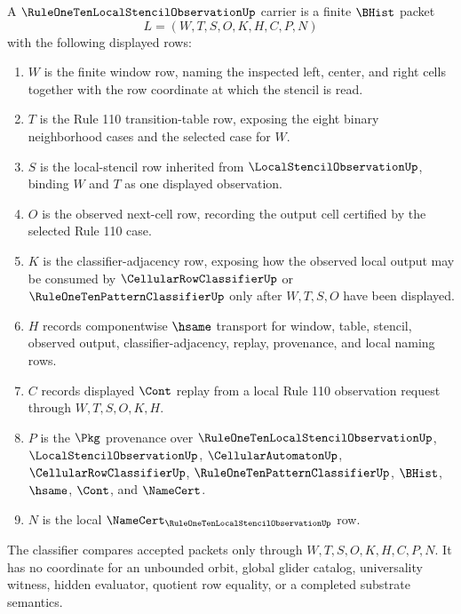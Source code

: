 \begin{definition}
\label{def:rule110-local-stencil-observation-carrier}
A $\RuleOneTenLocalStencilObservationUp$ carrier is a finite $\BHist$ packet
$$
L=(W,T,S,O,K,H,C,P,N)
$$
with the following displayed rows:
\begin{enumerate}
\item $W$ is the finite window row, naming the inspected left, center, and right cells together with the row coordinate at which the stencil is read.
\item $T$ is the Rule 110 transition-table row, exposing the eight binary neighborhood cases and the selected case for $W$.
\item $S$ is the local-stencil row inherited from $\LocalStencilObservationUp$, binding $W$ and $T$ as one displayed observation.
\item $O$ is the observed next-cell row, recording the output cell certified by the selected Rule 110 case.
\item $K$ is the classifier-adjacency row, exposing how the observed local output may be consumed by $\CellularRowClassifierUp$ or $\RuleOneTenPatternClassifierUp$ only after $W,T,S,O$ have been displayed.
\item $H$ records componentwise $\hsame$ transport for window, table, stencil, observed output, classifier-adjacency, replay, provenance, and local naming rows.
\item $C$ records displayed $\Cont$ replay from a local Rule 110 observation request through $W,T,S,O,K,H$.
\item $P$ is the $\Pkg$ provenance over $\RuleOneTenLocalStencilObservationUp$, $\LocalStencilObservationUp$, $\CellularAutomatonUp$, $\CellularRowClassifierUp$, $\RuleOneTenPatternClassifierUp$, $\BHist$, $\hsame$, $\Cont$, and $\NameCert$.
\item $N$ is the local $\NameCert_{\RuleOneTenLocalStencilObservationUp}$ row.
\end{enumerate}
The classifier compares accepted packets only through $W,T,S,O,K,H,C,P,N$. It has no coordinate for an unbounded orbit, global glider catalog, universality witness, hidden evaluator, quotient row equality, or a completed substrate semantics.
\end{definition}

